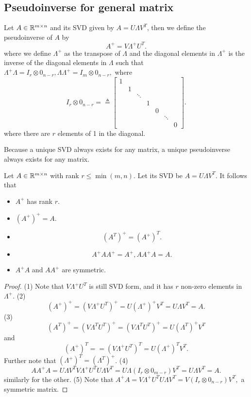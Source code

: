 \begin{refsection}
\subsection{Pseudoinverse for general matrix}
\begin{definition}
	Let $A\in \mathbb{R}^{m\times n}$ and its SVD given by $A = U\Lambda V^T$, then
we define the pseudoinverse of $A$ by
$$A^+ = V\Lambda^+ U^T.$$
where we define $\Lambda^+$ as the transpose of $\Lambda$ and the diagonal elements in $\Lambda^+$ is the inverse of the diagonal elements in $\Lambda$  such that $\Lambda^+\Lambda = I_r\otimes 0_{n-r} , \Lambda\Lambda^+ = I_m\otimes 0_{n-r},$
where 
$$I_r\otimes 0_{n-r} = \triangleq\begin{bmatrix}
1 &  &  &  &  &  & \\ 
& 1 &  &  &  &  & \\ 
&  & \ddots &  &  &  & \\ 
&  &  & 1 &  &  & \\ 
&  &  &  & 0 &  & \\ 
&  &  &  &  & \ddots & \\ 
&  &  &  &  &  & 0
\end{bmatrix}.$$
where there are $r$ elements of 1 in the diagonal. 	
\end{definition}

\begin{note}
Because a unique SVD always exists for any matrix, a unique pseudoinverse always exists for any matrix. 	
\end{note}


\begin{lemma}\label{ch:linearalgebra:th:BasicPropertyPseudoInverseGeneralMatrix}
Let $A\in \mathbb{R}^{m\times n}$ with rank $r\leq \min(m,n)$. Let its SVD be $A = U\Lambda V^T$. It follows that
\begin{itemize}
	\item $A^+$ has rank $r$.
	\item $(A^+)^+ = A.$
	\item 
	$$(A^T)^+ = (A^+)^T.$$
	\item 
	$$A^+AA^+ = A^+, AA^+A = A.$$
	\item 	$A^+A$ and $AA^+$ are symmetric.
	
\end{itemize}	
\end{lemma}
\begin{proof}
(1) Note that $V\Lambda^+ U^T$ is still SVD form, and it has $r$ non-zero elements in $\Lambda^+$. (2) $$(A^+)^+ = (V\Lambda^+ U^T)^+ = U(\Lambda^+)^+V^T = U\Lambda V^T = A.$$
(3) $$(A^T)^+ = (V\Lambda^T U^T)^+ = (V\Lambda^T U^T)^+ = U(\Lambda^T)^+V^T$$
and 
$$(A^+)^T = = (V\Lambda^+ U^T)^T = U(\Lambda^+)^TV^T.$$
Further note that $(\Lambda^+)^T = (\Lambda^T)^+$.
(4)
$$AA^+A = U\Lambda V^T V\Lambda^+ U^T U \Lambda V^T =U\Lambda(I_r\otimes 0_{m-r}) V^T  =U\Lambda V^T = A.$$
similarly for the other.
(5)
Note that $A^+A =  V\Lambda^+ U^T U \Lambda V^T = V(I_r\otimes 0_{n-r})V^T,$
a symmetric matrix.
\end{proof}



\end{refsection}
